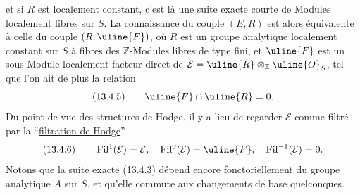 et si $R$ est localement constant, c'est là une suite exacte courte de Modules localement libres sur $S$. La connaissance du couple $(E,R)$ est alors équivalente à celle du couple $(R,\uline{F})$, où $R$ est un groupe analytique localement constant sur $S$ à fibres des $\mathbb Z$-Modules libres de type fini, et $\uline{F}$ est un sous-Module localement facteur direct de $\mathcal E=\uline{R}\otimes_{\mathbb Z}\uline{O}_S$, tel que l'on ait de plus la relation
\[
(13.4.5)\qquad\uline{F}\cap\uline{R}=0.
\]
Du point de vue des structures de Hodge, il y a lieu de regarder $\mathcal E$ comme filtré par la ``\uline{filtration de Hodge}''
\[
(13.4.6)\qquad\operatorname{Fil}^1(\mathcal E)=\mathcal E,\quad\operatorname{Fil}^0(\mathcal E)=\uline{F},\quad\operatorname{Fil}^{-1}(\mathcal E)=0.
\]
Notons que la suite exacte (13.4.3) dépend encore fonctoriellement du groupe analytique $A$ sur $S$, et qu'elle commute aux changements de base quelconques.
